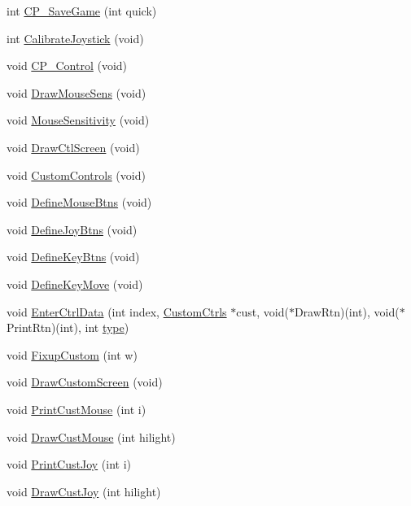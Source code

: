 \begin{DoxyCompactItemize}
\item 
int \hyperlink{WL__MENU_8C_a62fb7c17655ed1e0031cbeafd182ee31}{CP\_\-SaveGame} (int quick)
\item 
int \hyperlink{WL__MENU_8C_ad1faffefd1153f6d40ce3d2eaa598646}{CalibrateJoystick} (void)
\item 
void \hyperlink{WL__MENU_8C_a8d89e45be2c67ed682acb9ee0c09cd75}{CP\_\-Control} (void)
\item 
void \hyperlink{WL__MENU_8C_ac707d72c852bfe2a24938dde3c5397f6}{DrawMouseSens} (void)
\item 
void \hyperlink{WL__MENU_8C_a8a190d4f3b624a81b86aa5c75d1bd4d1}{MouseSensitivity} (void)
\item 
void \hyperlink{WL__MENU_8C_adc512396867a80e9e24c51d288b0c828}{DrawCtlScreen} (void)
\item 
void \hyperlink{WL__MENU_8C_a0631548359f161b2a227317582c6c4a6}{CustomControls} (void)
\item 
void \hyperlink{WL__MENU_8C_af9ffcf08793f2da25a6f54f439e15ddf}{DefineMouseBtns} (void)
\item 
void \hyperlink{WL__MENU_8C_a0a00df1716b0a174dc25901d829aea93}{DefineJoyBtns} (void)
\item 
void \hyperlink{WL__MENU_8C_a6f23a62131fda11af6f0aa3002bdfffb}{DefineKeyBtns} (void)
\item 
void \hyperlink{WL__MENU_8C_a666771efec8f7ee7f225adda60c1f5e0}{DefineKeyMove} (void)
\item 
void \hyperlink{WL__MENU_8C_a94d0412c951284a8ea98378116c23566}{EnterCtrlData} (int index, \hyperlink{structCustomCtrls}{CustomCtrls} $\ast$cust, void($\ast$DrawRtn)(int), void($\ast$PrintRtn)(int), int \hyperlink{WL__ACT1_8C_ac6913ebc2a188919d185cadc155a48cd}{type})
\item 
void \hyperlink{WL__MENU_8C_a7754ea2238d7a0c2711434bbc6b56379}{FixupCustom} (int w)
\item 
void \hyperlink{WL__MENU_8C_a2173c3a8943509f99cb5ac01f2a111a6}{DrawCustomScreen} (void)
\item 
void \hyperlink{WL__MENU_8C_a997209233b25445a026a6e5ca017dd57}{PrintCustMouse} (int i)
\item 
void \hyperlink{WL__MENU_8C_a79141a9518504a36ce3c15682aa836ec}{DrawCustMouse} (int hilight)
\item 
void \hyperlink{WL__MENU_8C_a88eda1a3eb3e81618c3fdd5debf5f8ff}{PrintCustJoy} (int i)
\item 
void \hyperlink{WL__MENU_8C_a91236b82219168a5270605919725ba2c}{DrawCustJoy} (int hilight)
\item 

\end{DoxyCompactItemize}
